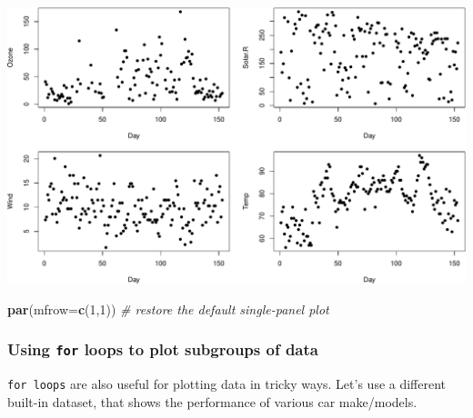 \documentclass[]{book}
\newenvironment{Shaded}{\begin{snugshade}}{\end{snugshade}}
\newcommand{\CommentTok}[1]{\textcolor[rgb]{0.56,0.35,0.01}{\textit{#1}}}
\newcommand{\DataTypeTok}[1]{\textcolor[rgb]{0.13,0.29,0.53}{#1}}
\newcommand{\DecValTok}[1]{\textcolor[rgb]{0.00,0.00,0.81}{#1}}
\newcommand{\KeywordTok}[1]{\textcolor[rgb]{0.13,0.29,0.53}{\textbf{#1}}}
\newcommand{\NormalTok}[1]{#1}
\begin{document}
\includegraphics{figures/unnamed-chunk-556-1.pdf}

\begin{Shaded}
\begin{Highlighting}[]

\KeywordTok{par}\NormalTok{(}\DataTypeTok{mfrow=}\KeywordTok{c}\NormalTok{(}\DecValTok{1}\NormalTok{,}\DecValTok{1}\NormalTok{)) }\CommentTok{# restore the default single-panel plot}
\end{Highlighting}
\end{Shaded}

\hypertarget{using-for-loops-to-plot-subgroups-of-data}{%
\subsubsection*{\texorpdfstring{Using \texttt{for} loops to plot subgroups of data}{Using for loops to plot subgroups of data}}\label{using-for-loops-to-plot-subgroups-of-data}}

\texttt{for\ loops} are also useful for plotting data in tricky ways. Let's use a different built-in dataset, that shows the performance of various car make/models.
\end{document}
